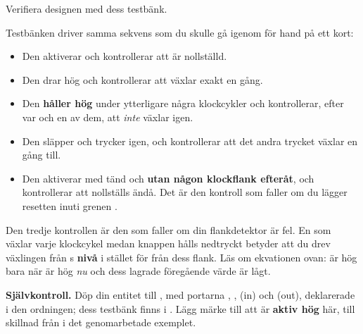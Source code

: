  Verifiera designen med dess testbänk.

Testbänken driver samma sekvens som du skulle gå igenom för hand på ett kort:
\begin{itemize}
  \item Den aktiverar  och kontrollerar att  är nollställd.
  \item Den drar  hög och kontrollerar att  växlar exakt en gång.
  \item Den \textbf{håller  hög} under ytterligare några klockcykler och kontrollerar,
    efter var och en av dem, att  \emph{inte} växlar igen.
  \item Den släpper och trycker igen, och kontrollerar att det andra trycket växlar  en
    gång till.
  \item Den aktiverar  med  tänd och \textbf{utan någon klockflank efteråt},
    och kontrollerar att  nollställs ändå. Det är den kontroll som faller om du lägger
    resetten inuti grenen .
\end{itemize}

Den tredje kontrollen är den som faller om din flankdetektor är fel. En  som växlar varje
klockcykel medan knappen hålls nedtryckt betyder att du drev växlingen från s
\textbf{nivå} i stället för från dess flank. Läs om ekvationen ovan:  är hög bara när
 är hög \emph{nu} och dess lagrade föregående värde är lågt.


\begin{selfcheck}
\textbf{Självkontroll.} Döp din entitet till , med portarna ,
,  (in) och  (out), deklarerade i den ordningen; dess testbänk
finns i . Lägg märke till att  är \textbf{aktiv hög}
här, till skillnad från i det genomarbetade exemplet.
\end{selfcheck}
